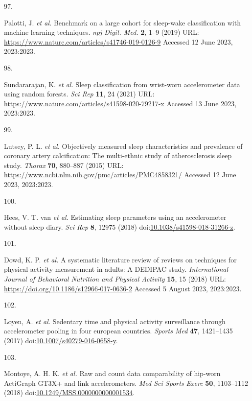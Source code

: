 \documentclass[
  10pt,
]{scrbook}
\newlength{\cslhangindent}
\newlength{\csllabelwidth}
\newlength{\cslentryspacingunit} %
\newenvironment{CSLReferences}[2] %
 {%
  \setlength{\parindent}{0pt}
  \ifodd #1
  \let\oldpar\par
  \def\par{\hangindent=\cslhangindent\oldpar}
  \fi
  \setlength{\parskip}{#2\cslentryspacingunit}
 }%
 {}
\newcommand{\CSLLeftMargin}[1]{\parbox[t]{\csllabelwidth}{#1}}
\newcommand{\CSLRightInline}[1]{\parbox[t]{\linewidth - \csllabelwidth}{#1}\break}
\let\originaltextbf\textbf
\renewcommand{\textbf}[1]{\textcolor{color1}{\originaltextbf{#1}}}
\begin{document}
\begin{CSLReferences}{0}{0}
\leavevmode{}%
\CSLLeftMargin{97. }%
\CSLRightInline{Palotti, J. \emph{et al.} Benchmark on a large cohort
for sleep-wake classification with machine learning techniques.
\emph{npj Digit. Med.} \textbf{2}, 1--9 (2019) URL:
\url{https://www.nature.com/articles/s41746-019-0126-9} Accessed 12 June
2023, 2023:2023.}

\leavevmode{}%
\CSLLeftMargin{98. }%
\CSLRightInline{Sundararajan, K. \emph{et al.} Sleep classification from
wrist-worn accelerometer data using random forests. \emph{Sci Rep}
\textbf{11}, 24 (2021) URL:
\url{https://www.nature.com/articles/s41598-020-79217-x} Accessed 13
June 2023, 2023:2023.}

\leavevmode{}%
\CSLLeftMargin{99. }%
\CSLRightInline{Lutsey, P. L. \emph{et al.} Objectively measured sleep
characteristics and prevalence of coronary artery calcification: The
multi-ethnic study of atherosclerosis sleep study. \emph{Thorax}
\textbf{70}, 880--887 (2015) URL:
\url{https://www.ncbi.nlm.nih.gov/pmc/articles/PMC4858321/} Accessed 12
June 2023, 2023:2023.}

\leavevmode{}%
\CSLLeftMargin{100. }%
\CSLRightInline{Hees, V. T. van \emph{et al.} Estimating sleep
parameters using an accelerometer without sleep diary. \emph{Sci Rep}
\textbf{8}, 12975 (2018)
doi:\href{https://doi.org/10.1038/s41598-018-31266-z}{10.1038/s41598-018-31266-z}.}

\leavevmode{}%
\CSLLeftMargin{101. }%
\CSLRightInline{Dowd, K. P. \emph{et al.} A systematic literature review
of reviews on techniques for physical activity measurement in adults: A
{DEDIPAC} study. \emph{International Journal of Behavioral Nutrition and
Physical Activity} \textbf{15}, 15 (2018) URL:
\url{https://doi.org/10.1186/s12966-017-0636-2} Accessed 5 August 2023,
2023:2023.}

\leavevmode{}%
\CSLLeftMargin{102. }%
\CSLRightInline{Loyen, A. \emph{et al.} Sedentary time and physical
activity surveillance through accelerometer pooling in four european
countries. \emph{Sports Med} \textbf{47}, 1421--1435 (2017)
doi:\href{https://doi.org/10.1007/s40279-016-0658-y}{10.1007/s40279-016-0658-y}.}

\leavevmode{}%
\CSLLeftMargin{103. }%
\CSLRightInline{Montoye, A. H. K. \emph{et al.} Raw and count data
comparability of hip-worn {ActiGraph} {GT}3X+ and link accelerometers.
\emph{Med Sci Sports Exerc} \textbf{50}, 1103--1112 (2018)
doi:\href{https://doi.org/10.1249/MSS.0000000000001534}{10.1249/MSS.0000000000001534}.}


\end{CSLReferences}
\end{document}
